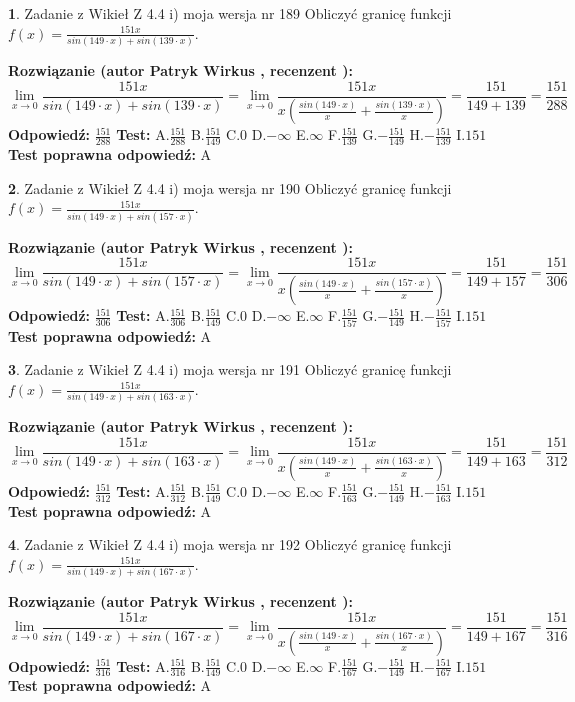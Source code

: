 \documentclass[12pt, a4paper]{article}
\theoremstyle{definition} %
\newtheorem{zad}{}
\newcommand{\zadStart}[1]{\begin{zad}#1\newline}
\newcommand{\zadStop}{\end{zad}}
\newcommand{\rozwStart}[2]{\noindent \textbf{Rozwiązanie (autor #1 , recenzent #2): }\newline}
\newcommand{\rozwStop}{\newline}
\newcommand{\odpStart}{\noindent \textbf{Odpowiedź:}\newline}
\newcommand{\odpStop}{\newline}
\newcommand{\testStart}{\noindent \textbf{Test:}\newline}
\newcommand{\testStop}{\newline}
\newcommand{\kluczStart}{\noindent \textbf{Test poprawna odpowiedź:}\newline}
\newcommand{\kluczStop}{\newline}
\begin{document}
\zadStart{Zadanie z Wikieł Z 4.4 i) moja wersja nr 189}
Obliczyć granicę funkcji $f(x)=\frac{151x}{sin(149\cdot x) +sin(139\cdot x)}$.
\zadStop
\rozwStart{Patryk Wirkus}{}
$$\lim\limits_{x\to 0}\frac{151x}{sin(149\cdot x) +sin(139\cdot x)}=\lim\limits_{x\to 0}\frac{151x}{x(\frac{sin(149\cdot x)}{x}+\frac{sin(139\cdot x)}{x})}=\frac{151}{149+139} = \frac{151}{288}$$
\rozwStop
\odpStart
$\frac{151}{288}$
\odpStop
\testStart
A.$\frac{151}{288}$
B.$\frac{151}{149}$
C.$0$
D.$-\infty$
E.$\infty$
F.$\frac{151}{139}$
G.$-\frac{151}{149}$
H.$-\frac{151}{139}$
I.$151$
\testStop
\kluczStart
A
\kluczStop



\zadStart{Zadanie z Wikieł Z 4.4 i) moja wersja nr 190}
Obliczyć granicę funkcji $f(x)=\frac{151x}{sin(149\cdot x) +sin(157\cdot x)}$.
\zadStop
\rozwStart{Patryk Wirkus}{}
$$\lim\limits_{x\to 0}\frac{151x}{sin(149\cdot x) +sin(157\cdot x)}=\lim\limits_{x\to 0}\frac{151x}{x(\frac{sin(149\cdot x)}{x}+\frac{sin(157\cdot x)}{x})}=\frac{151}{149+157} = \frac{151}{306}$$
\rozwStop
\odpStart
$\frac{151}{306}$
\odpStop
\testStart
A.$\frac{151}{306}$
B.$\frac{151}{149}$
C.$0$
D.$-\infty$
E.$\infty$
F.$\frac{151}{157}$
G.$-\frac{151}{149}$
H.$-\frac{151}{157}$
I.$151$
\testStop
\kluczStart
A
\kluczStop



\zadStart{Zadanie z Wikieł Z 4.4 i) moja wersja nr 191}
Obliczyć granicę funkcji $f(x)=\frac{151x}{sin(149\cdot x) +sin(163\cdot x)}$.
\zadStop
\rozwStart{Patryk Wirkus}{}
$$\lim\limits_{x\to 0}\frac{151x}{sin(149\cdot x) +sin(163\cdot x)}=\lim\limits_{x\to 0}\frac{151x}{x(\frac{sin(149\cdot x)}{x}+\frac{sin(163\cdot x)}{x})}=\frac{151}{149+163} = \frac{151}{312}$$
\rozwStop
\odpStart
$\frac{151}{312}$
\odpStop
\testStart
A.$\frac{151}{312}$
B.$\frac{151}{149}$
C.$0$
D.$-\infty$
E.$\infty$
F.$\frac{151}{163}$
G.$-\frac{151}{149}$
H.$-\frac{151}{163}$
I.$151$
\testStop
\kluczStart
A
\kluczStop



\zadStart{Zadanie z Wikieł Z 4.4 i) moja wersja nr 192}
Obliczyć granicę funkcji $f(x)=\frac{151x}{sin(149\cdot x) +sin(167\cdot x)}$.
\zadStop
\rozwStart{Patryk Wirkus}{}
$$\lim\limits_{x\to 0}\frac{151x}{sin(149\cdot x) +sin(167\cdot x)}=\lim\limits_{x\to 0}\frac{151x}{x(\frac{sin(149\cdot x)}{x}+\frac{sin(167\cdot x)}{x})}=\frac{151}{149+167} = \frac{151}{316}$$
\rozwStop
\odpStart
$\frac{151}{316}$
\odpStop
\testStart
A.$\frac{151}{316}$
B.$\frac{151}{149}$
C.$0$
D.$-\infty$
E.$\infty$
F.$\frac{151}{167}$
G.$-\frac{151}{149}$
H.$-\frac{151}{167}$
I.$151$
\testStop
\kluczStart
A
\kluczStop
\end{document}
